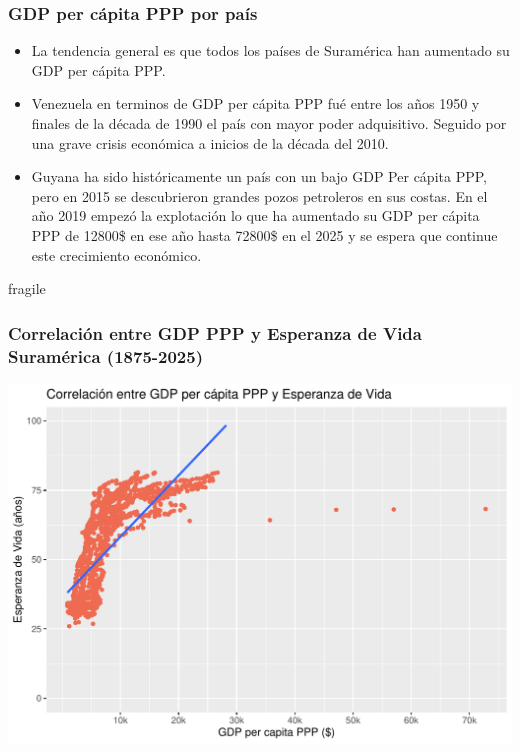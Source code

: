 \documentclass{beamer}
\begin{document}
\begin{frame}[fragile]
\frametitle{GDP per cápita PPP por país}
\begin{itemize}
\item<1> La tendencia general es que todos los países de Suramérica han aumentado su GDP per cápita PPP.
\item<2> Venezuela en terminos de GDP per cápita PPP fué entre los años 1950 y finales de la década de 1990 el país con mayor poder adquisitivo. Seguido por una grave crisis económica a inicios de la década del 2010.
\item<3> Guyana ha sido históricamente un país con un bajo GDP Per cápita PPP, pero en 2015 se descubrieron grandes pozos petroleros en sus costas. En el año 2019 empezó la explotación lo que ha aumentado su GDP per cápita PPP de 12800\$ en ese año hasta 72800\$ en el 2025 y se espera que continue este crecimiento económico.
\end{itemize}
\end{frame}


\begin{frame}{fragile}
\frametitle{Correlación entre GDP  PPP y Esperanza de Vida Suramérica (1875-2025)}
\includegraphics{presentacion_Parada_G_M8R2-005}
\end{frame}
\end{document}
